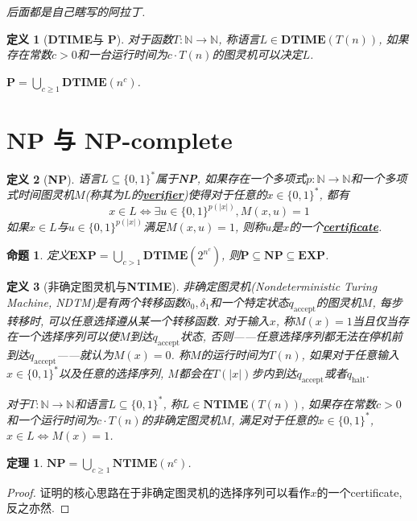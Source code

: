 \documentclass[8pt]{article}
\theoremstyle{compact}
\newtheorem{theorem}{定理}
\newtheorem{definition}{定义}
\newtheorem{proposition}{命题}
\def\obj#1{\textbf{\uline{#1}}}
\def\ge{\geqslant}
\def\DTIME{\textbf{DTIME}}
\def\NTIME{\textbf{NTIME}}
\def\P{\textbf{P}}
\def\NP{\textbf{NP}}
\def\EXP{\textbf{EXP}}
\begin{document}
\newpage\vspace*{\fill}\begin{center}\textit{后面都是自己瞎写的阿拉丁.}\end{center}\vspace*{\fill}

\newpage

\begin{definition}[\DTIME 与 \P]
	对于函数$T: \mathbb N \to \mathbb N$, 称语言$L \in \DTIME(T(n))$, 如果存在常数$c > 0$和一台运行时间为$c \cdot T(n)$的图灵机可以决定$L$. 

	$\P = \bigcup_{c \ge 1}\DTIME(n^c)$. 
\end{definition}



\newpage
\section{NP 与 NP-complete}

\begin{definition}[\NP]
	语言$L \subseteq \{0, 1\}^*$属于\NP, 如果存在一个多项式$p: \mathbb N \to \mathbb N$和一个多项式时间图灵机$M$(称其为$L$的\obj{verifier})使得对于任意的$x \in \{0, 1\}^*$, 都有
	$$x \in L \Leftrightarrow \exists u \in \{0, 1\}^{p(|x|)}, M(x, u) = 1$$
	如果$x \in L$与$u \in \{0, 1\}^{p(|x|)}$满足$M(x, u) = 1$, 则称$u$是$x$的一个\obj{certificate}. 
\end{definition}
\begin{proposition}
	定义$\EXP = \bigcup_{c > 1} \DTIME(2^{n^c})$, 则$\P \subseteq \NP \subseteq \EXP$. 
\end{proposition}
\begin{definition}[非确定图灵机与\NTIME]
	非确定图灵机(Nondeterministic Turing Machine, NDTM)是有两个转移函数$\delta_0, \delta_1$和一个特定状态$q_{\text{accept}}$的图灵机$M$, 每步转移时, 可以任意选择遵从某一个转移函数. 对于输入$x$, 称$M(x) = 1$当且仅当存在一个选择序列可以使$M$到达$q_{\text{accept}}$状态, 否则——任意选择序列都无法在停机前到达$q_{\text{accept}}$——就认为$M(x) = 0$. 称$M$的运行时间为$T(n)$, 如果对于任意输入$x \in \{0, 1\}^*$以及任意的选择序列, $M$都会在$T(|x|)$步内到达$q_{\text{accept}}$或者$q_{\text{halt}}$. 

	对于$T: \mathbb N \to \mathbb N$和语言$L \subseteq \{0, 1\}^*$, 称$L \in \NTIME(T(n))$, 如果存在常数$c > 0$和一个运行时间为$c \cdot T(n)$的非确定图灵机$M$, 满足对于任意的$x \in \{0, 1\}^*$, $x \in L \Leftrightarrow M(x) = 1$. 
\end{definition}
\begin{theorem}
	$\NP = \bigcup_{c \ge 1} \NTIME(n^c)$. 
\end{theorem}
\begin{proof}
	证明的核心思路在于非确定图灵机的选择序列可以看作$x$的一个certificate, 反之亦然. 
\end{proof}
\end{document}
